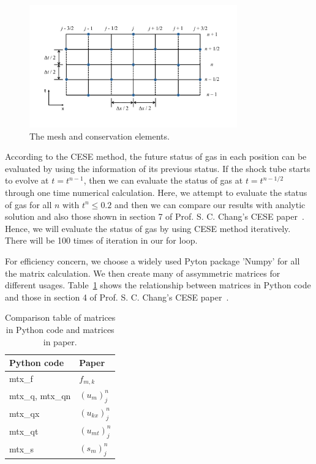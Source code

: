 \documentclass[a4paper,12pt]{article}
\begin{document}
 \begin{figure}[ht]
    \centering
     \includegraphics[width=0.8\textwidth]{mesh_and_ce.pdf}
     \caption{The mesh and conservation elements.}
     \label{fig:mesh_and_ce_v2}
 \end{figure}

According to the CESE method, the future status of gas in each position can be evaluated by using the information of its previous status. If the shock tube starts to evolve at $t=t^{n-1}$, then we can evaluate the status of gas at $t=t^{n-1/2}$ through one time numerical calculation. 
Here, we attempt to evaluate the status of gas for all $n$ with $t^{n}\leq0.2$ and then we can compare our results with analytic solution and also those shown in section 7 of Prof. S. C. Chang's CESE paper~\cite{CESE_Shin_Chung_Chang_1995}. Hence, we will evaluate the status of gas by using CESE method iteratively. There will be 100 times of iteration in our for loop.

For efficiency concern, we choose a widely used Pyton package 'Numpy' for all the matrix calculation. We then create many of assymmetric matrices for different usages. Table~\ref{tab:mtx_comparision} shows the relationship between matrices in Python code and those in section 4 of Prof. S. C. Chang's CESE paper~\cite{CESE_Shin_Chung_Chang_1995}.

\begin{table}[ht]
\begin{center}
\caption{Comparison table of matrices in Python code and matrices in paper. \label{tab:mtx_comparision}}
\begin{tabular}{l|l}
\hline\hline
Python code         & Paper \\\hline
mtx\_f              & $f_{m,k}$ \\
mtx\_q, mtx\_qn     & $(u_{m})^{n}_{j}$ \\ 
mtx\_qx             & $(u_{kx})^{n}_{j}$ \\
mtx\_qt             & $(u_{mt})^{n}_{j}$ \\
mtx\_s              & $(s_{m})^{n}_{j}$ \\
\hline\hline
\end{tabular}
\end{center}
\end{table}
\end{document}
